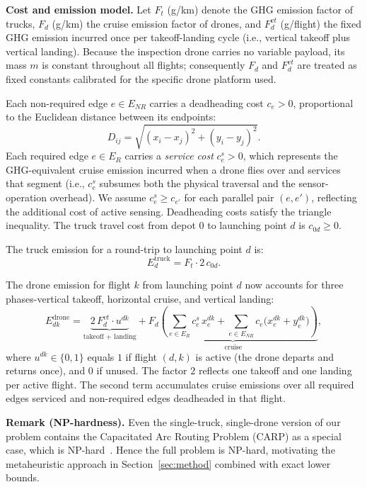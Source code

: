 \documentclass[a4paper,fleqn]{cas-dc}
\begin{document}
\textbf{Cost and emission model.}
Let $F_t$ (g/km) denote the GHG emission factor of trucks, $F_d$ (g/km) the cruise emission factor of drones, and $F_d^{vt}$ (g/flight) the fixed GHG emission incurred once per takeoff-landing cycle (i.e., vertical takeoff plus vertical landing). Because the inspection drone carries no variable payload, its mass $m$ is constant throughout all flights; consequently $F_d$ and $F_d^{vt}$ are treated as fixed constants calibrated for the specific drone platform used.

Each non-required edge $e \in E_{NR}$ carries a deadheading cost $c_e > 0$, proportional to the Euclidean distance between its endpoints:
\begin{equation}\label{eq:distance}
 D_{ij} = \sqrt{(x_i - x_j)^2 + (y_i - y_j)^2}.
\end{equation}
Each required edge $e \in E_R$ carries a \emph{service cost} $c^s_e > 0$, which represents the GHG-equivalent cruise emission incurred when a drone flies over and services that segment (i.e., $c^s_e$ subsumes both the physical traversal and the sensor-operation overhead). We assume $c^s_e \geq c_{e'}$ for each parallel pair $(e, e')$, reflecting the additional cost of active sensing. Deadheading costs satisfy the triangle inequality. The truck travel cost from depot $0$ to launching point $d$ is $c_{0d} \geq 0$.

The truck emission for a round-trip to launching point $d$ is:
\begin{equation}\label{eq:truck_cost}
 E^{\mathrm{truck}}_d = F_t \cdot 2\,c_{0d}.
\end{equation}

The drone emission for flight $k$ from launching point $d$ now accounts for three phases-vertical takeoff, horizontal cruise, and vertical landing:
\begin{equation}\label{eq:drone_cost}
 E^{\mathrm{drone}}_{dk} =
 \underbrace{2\,F_d^{vt} \cdot u^{dk}}_{\text{takeoff + landing}}
 + \underbrace{F_d \!\left(
   \sum_{e \in E_R} c^s_e\, x^{dk}_e
   + \sum_{e \in E_{NR}} c_e \bigl(x^{dk}_e + y^{dk}_e\bigr)
 \right)}_{\text{cruise}},
\end{equation}
where $u^{dk} \in \{0,1\}$ equals $1$ if flight $(d,k)$ is active (the drone departs and returns once), and $0$ if unused. The factor $2$ reflects one takeoff and one landing per active flight. The second term accumulates cruise emissions over all required edges serviced and non-required edges deadheaded in that flight.

\textbf{Remark (NP-hardness).}
Even the single-truck, single-drone version of our problem contains the Capacitated Arc Routing Problem (CARP) as a special case, which is NP-hard~\cite{golden1981}. Hence the full problem is NP-hard, motivating the metaheuristic approach in Section~\ref{sec:method} combined with exact lower bounds.
\end{document}
